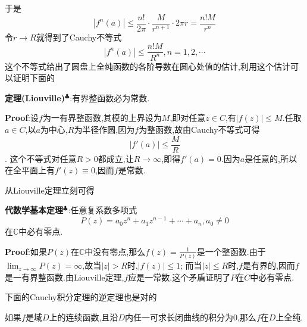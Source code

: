 于是
$$
|f^{n}(a)|\leqslant \frac{n!}{2\pi}\cdot \frac{M}{r^{n+1}}\cdot 2\pi r=\frac{n!M}{r^n}
$$
令$r\to R$就得到了Cauchy不等式
$$
|f^{n}(a)|\leqslant \frac{n!M}{R^n},n=1,2,\cdots
$$
这个不等式给出了圆盘上全纯函数的各阶导数在圆心处值的估计,利用这个估计可以证明下面的\par
\textbf{定理(Liouville)}$^\clubsuit$:有界整函数必为常数.\par
\textbf{Proof}:设$f$为一有界整函数,其模的上界设为$M$,即对任意$z\in C$,有$|f(z)|\leqslant M$.任取$a\in C$,以$a$为中心,$R$为半径作圆,因为$f$为整函数,故由Cauchy不等式可得
$$
|f'(a)|\leqslant \frac{M}{R}
$$.
这个不等式对任意$R>0$都成立,让$R\to\infty$,即得$f'(a)=0$.因为$a$是任意的,所以在全平面上有$f'(z)\equiv 0$,因而$f$是常数.\par
从Liouville定理立刻可得\par
\textbf{代数学基本定理}$^\clubsuit$:任意复系数多项式
$$
P(z)=a_0z^n+a_1z^{n-1}+\cdots+a_n,a_0\neq0
$$ 
在$\mathbb{C}$中必有零点.\par
\textbf{Proof}:如果$P(z)$在$\mathbb{C}$中没有零点,那么$f(z)=\frac{1}{P(z)}$是一个整函数.由于$\lim_{z\to\infty}P(z)=\infty$,故当$|z|>R$时,$|f(z)|\leqslant 1$;
而当$|z|\leqslant R$时,$f$是有界的,因而$f$是一有界整函数.由Liouville定理,$f$应是一常数.这个矛盾证明了$P$在$C$中必有零点.\par
下面的Cauchy积分定理的逆定理也是对的
\begin{tcolorbox}[colback=KuangNei,colframe=BianKuang,title=\textbf{Morera},sharpish corners]
    如果$f$是域$D$上的连续函数,且沿$D$内任一可求长闭曲线的积分为0,那么$f$在$D$上全纯.
\end{tcolorbox}
